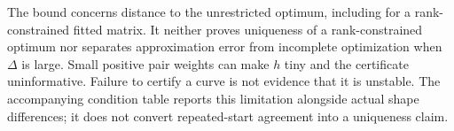 \documentclass[aps,pre,onecolumn,10pt,superscriptaddress]{revtex4-2}
\begin{document}
The bound concerns distance to the unrestricted optimum, including for a rank-constrained fitted matrix.
It neither proves uniqueness of a rank-constrained optimum nor separates approximation error from incomplete optimization when \(\Delta\) is large.
Small positive pair weights can make \(h\) tiny and the certificate uninformative.
Failure to certify a curve is not evidence that it is unstable.
The accompanying condition table reports this limitation alongside actual shape differences; it does not convert repeated-start agreement into a uniqueness claim.
\end{document}
